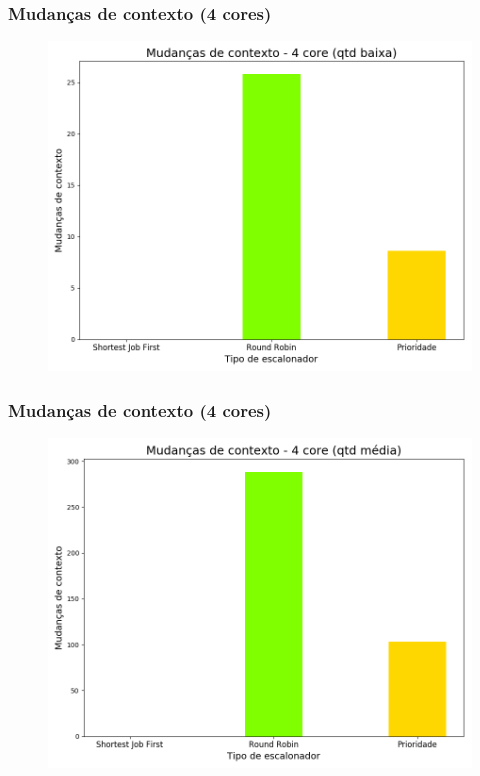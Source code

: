 \documentclass{beamer}
\begin{document}
\begin{frame}
\frametitle{Mudanças de contexto (4 cores)}
\begin{figure}
\includegraphics[scale=0.4]{ctx_small_4.png}
\end{figure}
\end{frame}

\begin{frame}
\frametitle{Mudanças de contexto (4 cores)}
\begin{figure}
\includegraphics[scale=0.4]{ctx_med_4.png}
\end{figure}
\end{frame}
\end{document}
